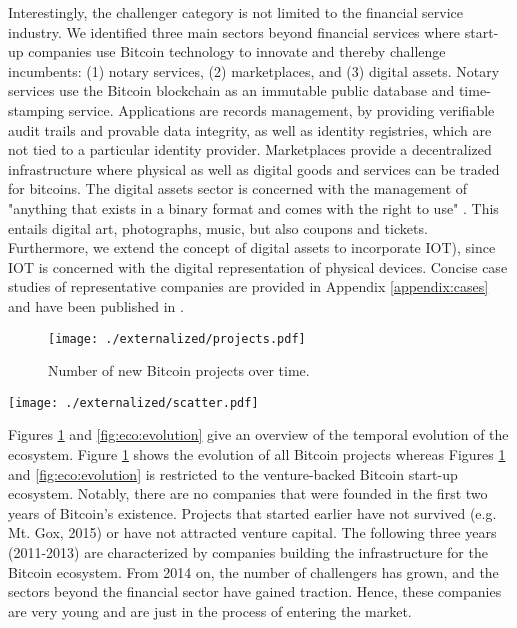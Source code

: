 Interestingly, the challenger category is not limited to the financial service 
industry. We identified three main sectors beyond financial services where start-up companies 
use Bitcoin technology to innovate and thereby challenge incumbents: (1) notary 
services, (2) marketplaces, and (3) digital assets. Notary services use the Bitcoin 
blockchain as an immutable public database and time-stamping service. Applications 
are records management, by providing verifiable audit trails and provable data 
integrity, as well as identity registries, which are not tied to a particular identity 
provider. Marketplaces provide a decentralized infrastructure where physical as 
well as digital goods and services can be traded for bitcoins. The digital assets 
sector is concerned with the management of "anything that exists in a binary format 
and comes with the right to use" \parencite{wikipedia2016da}. This entails digital art, 
photographs, music, but also coupons and tickets. Furthermore, we extend the 
concept of digital assets to incorporate \ac{IOT}), since \ac{IOT} 
is concerned with the digital representation of physical devices. Concise case studies of representative companies are provided in Appendix \ref{appendix:cases} and have been published in \parencite{Worner2016ecis}. 

\begin{figure}
\centering
\texttt{[image: ./externalized/projects.pdf]}
\caption{Number of new Bitcoin projects over time.}
\label{fig:eco:projects}
\end{figure}

\begin{sidewaysfigure}
\centering
\texttt{[image: ./externalized/scatter.pdf]}
\caption{Evolution of the venture-backed Bitcoin start-up ecosystem.}
\label{fig:eco:evolution}
\end{sidewaysfigure}

Figures \ref{fig:eco:projects} and \ref{fig:eco:evolution} give an overview of the temporal evolution of the ecosystem. Figure 
\ref{fig:eco:projects} shows the evolution of all Bitcoin projects whereas 
Figures \ref{fig:eco:projects} and \ref{fig:eco:evolution} is restricted to 
the venture-backed Bitcoin start-up ecosystem. Notably, there are no companies 
that were founded in the first two years of Bitcoin's existence. Projects that 
started earlier have not survived (e.g. Mt. Gox, 2015) or have not attracted venture 
capital. The following three years (2011-2013) are characterized by companies building 
the infrastructure for the Bitcoin ecosystem. From 2014 on, the number of challengers 
has grown, and the sectors beyond the financial sector have gained traction. Hence, 
these companies are very young and are just in the process of entering the market.

